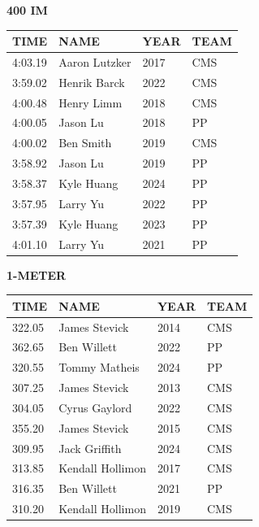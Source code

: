 \begin{table}[H]
\centering
\begin{minipage}[t]{0.6\textwidth}
\centering
\textbf{400 IM}\\[0.1cm]
\begin{tabular}{@{}p{1.8cm}p{2.8cm}p{1.2cm}p{1.4cm}@{}}
\hline
    \textbf{TIME} & \textbf{NAME} & \textbf{YEAR} & \textbf{TEAM} \\
\hline
    4:03.19 & Aaron Lutzker & 2017 & CMS \\
    3:59.02 & Henrik Barck & 2022 & CMS \\
    4:00.48 & Henry Limm & 2018 & CMS \\
    4:00.05 & Jason Lu & 2018 & PP \\
    4:00.02 & Ben Smith & 2019 & CMS \\
    3:58.92 & Jason Lu & 2019 & PP \\
    3:58.37 & Kyle Huang & 2024 & PP \\
    3:57.95 & Larry Yu & 2022 & PP \\
    3:57.39 & Kyle Huang & 2023 & PP \\
    4:01.10 & Larry Yu & 2021 & PP \\
\hline
\end{tabular}
\end{minipage}
\end{table}

\begin{table}[H]
\centering
\begin{minipage}[t]{0.6\textwidth}
\centering
\textbf{1-METER}\\[0.1cm]
\begin{tabular}{@{}p{1.8cm}p{2.8cm}p{1.2cm}p{1.4cm}@{}}
\hline
    \textbf{TIME} & \textbf{NAME} & \textbf{YEAR} & \textbf{TEAM} \\
\hline
    322.05 & James Stevick & 2014 & CMS \\
    362.65 & Ben Willett & 2022 & PP \\
    320.55 & Tommy Matheis & 2024 & PP \\
    307.25 & James Stevick & 2013 & CMS \\
    304.05 & Cyrus Gaylord & 2022 & CMS \\
    355.20 & James Stevick & 2015 & CMS \\
    309.95 & Jack Griffith & 2024 & CMS \\
    313.85 & Kendall Hollimon & 2017 & CMS \\
    316.35 & Ben Willett & 2021 & PP \\
    310.20 & Kendall Hollimon & 2019 & CMS \\
\hline
\end{tabular}
\end{minipage}
\end{table}

